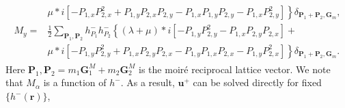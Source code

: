 \documentclass[aps,prx,10pt,twocolumn,superscriptaddress]{revtex4}
\begin{document}
\begin{widetext}
\begin{align}
\begin{split}
&\left.\mu *i\left[-P_{1,x}P^{2}_{2,x}+P_{1,y}P_{2,x}P_{2,y}-P_{1,x}P_{1,y}P_{2,y}-P_{1,x}P^{2}_{2,y}\right]\right\}\delta_{\textbf{P}_{1}+\textbf{P}_{2},\textbf{G}_{m}},\\
M_{y}=&\frac{1}{2}\sum_{\textbf{P}_{1},\textbf{P}_{2}}h^{-}_{P_{1}}h^{-}_{P_{2}}\left\{(\lambda+\mu)*i\left[-P_{1,y}P^{2}_{2,y}-P_{1,x}P_{2,y}P_{2,x}\right]\right.+\\
&\left.\mu *i\left[-P_{1,y}P^{2}_{2,y}+P_{1,x}P_{2,y}P_{2,x}-P_{1,y}P_{1,x}P_{2,x}-P_{1,y}P^{2}_{2,x}\right]\right\}\delta_{\textbf{P}_{1}+\textbf{P}_{2},\textbf{G}_{m}}.
\end{split}
\end{align}
Here $\textbf{P}_{1}, \textbf{P}_{2}\!=\!m_{1}\textbf{G}^{M}_{1}+m_{2}\textbf{G}^{M}_{2}$ is the moir\'e reciprocal lattice vector. We note that $M_{\alpha}$ is a function of $h^{-}$. As a result, $\textbf{u}^{+}$ can be solved directly for fixed $\{h^{-}(\textbf{r})\}$, 


\end{widetext}
\end{document}
